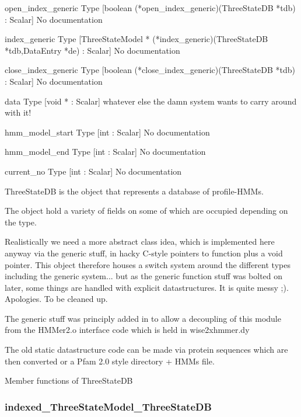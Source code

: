 \begin{description}
\item{open_index_generic} Type [boolean (*open_index_generic)(ThreeStateDB *tdb) : Scalar] No documentation

\item{index_generic} Type [ThreeStateModel * (*index_generic)(ThreeStateDB *tdb,DataEntry *de) : Scalar] No documentation

\item{close_index_generic} Type [boolean (*close_index_generic)(ThreeStateDB *tdb) : Scalar] No documentation

\item{data} Type [void * : Scalar]  whatever else the damn system wants to carry around with it! 

\item{hmm_model_start} Type [int  : Scalar] No documentation

\item{hmm_model_end} Type [int  : Scalar] No documentation

\item{current_no} Type [int  : Scalar] No documentation

\end{description}
ThreeStateDB is the object that represents
a database of profile-HMMs. 


The object hold a variety of fields on some of which are
occupied depending on the type.


Realistically we need a more abstract class idea, which is
implemented here anyway via the generic stuff, in hacky
C-style pointers to function plus a void pointer. This object
therefore houses a switch system around the different types
including the generic system... but as the generic function
stuff was bolted on later, some things are handled with
explicit datastructures. It is quite messy ;). Apologies.
To be cleaned up.


The generic stuff was principly added in to allow a decoupling of this module
from the HMMer2.o interface code which is held in wise2xhmmer.dy


The old static datastructure code can be 
made via protein sequences which are then converted or a 
Pfam 2.0 style directory + HMMs file.




Member functions of ThreeStateDB

\subsubsection{indexed_ThreeStateModel_ThreeStateDB}

